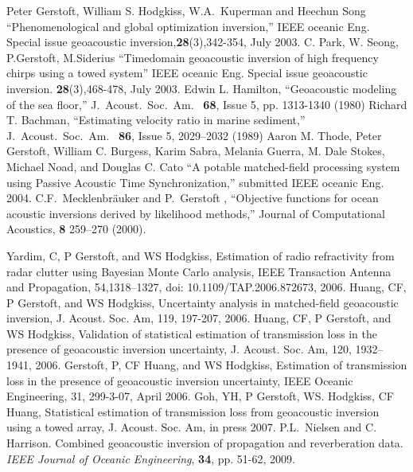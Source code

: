 \documentclass{saclantc}
\begin{document}
\begin{thebibliography}{11}
Peter Gerstoft, William S. Hodgkiss,  W.A.~Kuperman and  Heechun Song
``Phenomenological and global optimization inversion,'' IEEE oceanic
Eng. Special issue geoacoustic inversion,{\bf 28}(3),342-354, July 2003. 
C. Park, W. Seong, P.Gerstoft, M.Siderius ``Timedomain geoacoustic
inversion of high frequency chirps using a towed system''
IEEE oceanic Eng.  Special issue geoacoustic inversion. 
{\bf 28}(3),468-478, July 2003. 
Edwin L. Hamilton, ``Geoacoustic modeling of the sea floor,''
{J.~Acoust.~Soc.~Am.\ } {\bf 68},
Issue 5, pp. 1313-1340 (1980)
Richard T. Bachman,
``Estimating velocity ratio in marine sediment,''
{J.~Acoust.~Soc.~Am.\ } {\bf 86}, Issue 5, 2029--2032 (1989)
 Aaron M. Thode, Peter Gerstoft, William C. Burgess,
 Karim Sabra, Melania Guerra, M. Dale Stokes, Michael Noad, and
 Douglas C. Cato ``A potable matched-field processing system using Passive Acoustic Time Synchronization,''
submitted IEEE oceanic Eng. 2004.
  C.F.\ Mecklenbr{\"a}uker and P.~Gerstoft , ``Objective functions for ocean
acoustic inversions derived by likelihood methods,''
Journal of Computational Acoustics, {\bf 8} 259--270 (2000).

Yardim, C, P Gerstoft, and WS Hodgkiss, Estimation of radio refractivity from radar clutter using Bayesian Monte Carlo analysis, IEEE Transaction Antenna and Propagation, 54,1318--1327, doi: 10.1109/TAP.2006.872673, 2006. 
Huang, CF, P Gerstoft, and WS Hodgkiss, Uncertainty analysis in matched-field geoacoustic inversion, J. Acoust. Soc. Am, 119, 197-207, 2006.
Huang, CF, P Gerstoft, and WS Hodgkiss, Validation of statistical estimation of transmission loss in the presence of geoacoustic inversion uncertainty, J. Acoust. Soc. Am, 120, 1932--1941, 2006. 
Gerstoft, P, CF Huang, and WS Hodgkiss, Estimation of transmission loss in the presence of geoacoustic inversion uncertainty, IEEE Oceanic Engineering, 31, 299-3-07, April 2006. 
Goh, YH,  P Gerstoft, WS. Hodgkiss, CF Huang,  Statistical estimation of transmission loss from geoacoustic inversion using a towed array, J. Acoust. Soc. Am, in press 2007. 
 P.L.~Nielsen and C. Harrison. Combined geoacoustic inversion of propagation and reverberation data. {\it IEEE Journal of Oceanic Engineering}, {\bf 34}, pp. 51-62, 2009.



\end{thebibliography}
\end{document}
